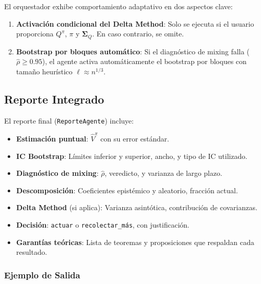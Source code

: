 \documentclass[12pt,a4paper]{article}
\begin{document}
El orquestador exhibe comportamiento adaptativo en dos aspectos clave:

\begin{enumerate}
	\item \textbf{Activación condicional del Delta Method}: Solo se ejecuta si el usuario proporciona $Q^{\pi}$, $\pi$ y $\boldsymbol{\Sigma}_Q$. En caso contrario, se omite.
	\item \textbf{Bootstrap por bloques automático}: Si el diagnóstico de mixing falla ($\hat{\rho} \geq 0.95$), el agente activa automáticamente el bootstrap por bloques con tamaño heurístico $\ell \approx n^{1/3}$.
\end{enumerate}

\subsection{Reporte Integrado}

El reporte final (\texttt{ReporteAgente}) incluye:

\begin{itemize}
	\item \textbf{Estimación puntual}: $\hat{V}^{\pi}$ con su error estándar.
	\item \textbf{IC Bootstrap}: Límites inferior y superior, ancho, y tipo de IC utilizado.
	\item \textbf{Diagnóstico de mixing}: $\hat{\rho}$, veredicto, y varianza de largo plazo.
	\item \textbf{Descomposición}: Coeficientes epistémico y aleatorio, fracción actual.
	\item \textbf{Delta Method} (si aplica): Varianza asintótica, contribución de covarianzas.
	\item \textbf{Decisión}: \texttt{actuar} o \texttt{recolectar\_más}, con justificación.
	\item \textbf{Garantías teóricas}: Lista de teoremas y proposiciones que respaldan cada resultado.
\end{itemize}

\subsubsection{Ejemplo de Salida}
\end{document}
